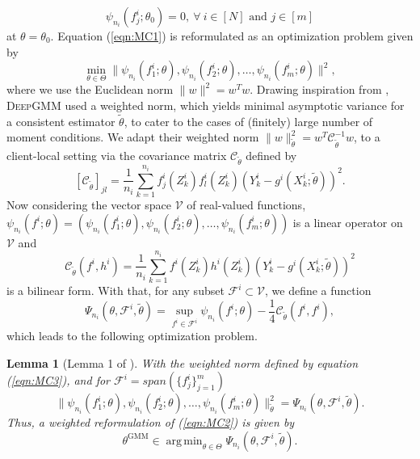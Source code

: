 \documentclass{article}
\let\cite\relax
\newcommand*{\cite}{\citep}
\def\gC{{\mathcal{C}}}
\DeclareMathOperator*{\argmin}{arg\,min}
\newcommand{\dgmm}{\textsc{DeepGMM}\xspace}
\newtheorem{lemma}{Lemma}%
\theoremstyle{definition}
\begin{document}
\begin{equation}\label{eqn:MC1}
	\psi_{n_i}(f_{j}^{i};\theta_0)=0,~ \forall~ i\in[N] \text{ and } j\in[m]
\end{equation}
at $\theta=\theta_0$. Equation (\ref{eqn:MC1}) is reformulated as an optimization problem given by 
\begin{equation}\label{eqn:MC2}
	\min_{\theta\in\Theta}\|\psi_{n_i}(f^i_1;\theta),\psi_{n_i}(f^i_2;\theta),\ldots, \psi_{n_i}(f^i_m;\theta)\|^2,
\end{equation}
where we use the Euclidean norm $\|w\|^2=w^Tw$. Drawing inspiration from \citet{hansen1982large}, \dgmm used a weighted norm, which yields minimal asymptotic variance for a consistent estimator $\tilde{\theta}$, to cater to the cases of (finitely) large number of moment conditions. We adapt their weighted norm $\|w\|^2_{\tilde{\theta}}=w^T\gC_{\tilde{\theta}}^{-1}w$, to a client-local setting via the covariance matrix $\gC_{\tilde{\theta}}$ defined by
\begin{equation}\label{eqn:MC3}
	\left[\gC_{\tilde{\theta}}\right]_{jl}=\frac{1}{n_i}\sum_{k=1}^{n_i}f^i_j(Z^i_k)f^i_l(Z^i_k)(Y^i_k-g^i(X^i_k;\tilde{\theta}))^2.
\end{equation}
Now considering the vector space $\mathcal{V}$ of real-valued functions, $\psi_{n_i}(f^i;\theta)=\left(\psi_{n_i}(f^i_1;\theta),\psi_{n_i}(f^i_2;\theta),\ldots, \psi_{n_i}(f^i_m;\theta)\right)$ is a linear operator on $\mathcal{V}$ and 
\begin{equation}\label{eqn:MC4}
	\gC_{\tilde{\theta}}(f^i,h^i)=\frac{1}{n_i}\sum_{k=1}^{n_i}f^i(Z^i_k)h^i(Z^i_k)(Y^i_k-g^i(X^i_k;\tilde{\theta}))^2
\end{equation}
is a bilinear form. With that, for any subset $\mathcal{F}^i\subset\mathcal{V}$, we define a function 
\begin{equation*}
	\Psi_{n_i}(\theta,\mathcal{F}^i,\tilde{\theta})= \sup_{f^i\in\mathcal{F}^i} \psi_{n_i}(f^i;\theta)-\frac{1}{4}\gC_{\tilde{\theta}}(f^i,f^i),
\end{equation*}
which leads to the following optimization problem.
\begin{lemma}[Lemma 1 of \cite{bennett2019deep}]
	\label{lemma:U} 
	With the weighted norm defined by equation (\ref{eqn:MC3}), and for $\mathcal{F}^i=span(\{f^i_j\}_{j=1}^m)$
	\begin{equation}\label{eqn:MC6}
		\|\psi_{n_i}(f^i_1;\theta),\psi_{n_i}(f^i_2;\theta),\ldots, \psi_{n_i}(f^i_m;\theta)\|^2_{\tilde{\theta}}=\Psi_{n_i}(\theta,\mathcal{F}^i,\tilde{\theta}).
	\end{equation}
	Thus, a weighted reformulation of (\ref{eqn:MC2}) is given by
	\begin{equation}\label{eqn:MC7}
		\theta^{\text{GMM}}\in\argmin_{\theta \in \Theta}\Psi_{n_i}(\theta,\mathcal{F}^i,\tilde{\theta}).
	\end{equation}	
\end{lemma}
\end{document}
